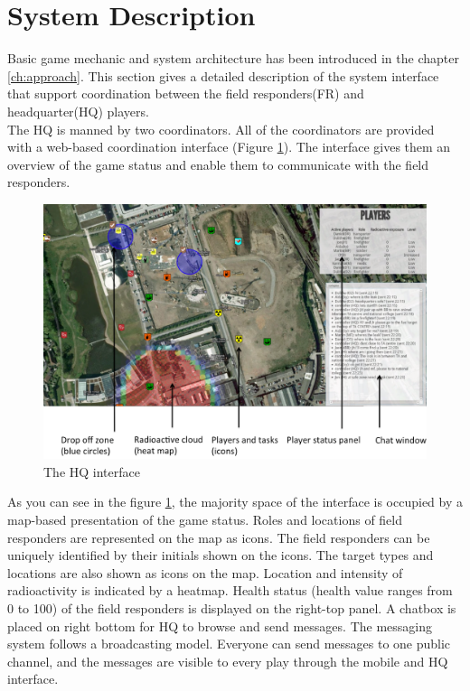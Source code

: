 \section{System Description}\label{sec:system1}
Basic game mechanic and system architecture has been introduced in the chapter \ref{ch:approach}. This section gives a detailed description of the system interface that support coordination between the field responders(FR) and headquarter(HQ) players. \\

The HQ is manned by two coordinators. All of the coordinators are provided with a web-based coordination interface (Figure \ref{fig:HQinterface}). The interface gives them an overview of the game status and enable them to communicate with the field responders. \\

\begin{figure}[h]
  \centering
  \includegraphics[width=1\textwidth]{img/study1/webinterface}
  \caption{The HQ interface}
  \label{fig:HQinterface}
\end{figure}

As you can see in the figure \ref{fig:HQinterface}, the majority space of the interface is occupied by a map-based presentation of the game status. Roles and locations of field responders are represented on the map as icons. The field responders can be uniquely identified by their initials shown on the icons. The target types and locations are also shown as icons on the map. Location and intensity of radioactivity is indicated by a heatmap. Health status (health value ranges from 0 to 100) of the field responders is displayed on the right-top panel. A chatbox is placed on right bottom for HQ to browse and send messages. The messaging system follows a broadcasting model. Everyone can send messages to one public channel, and the messages are visible to every play through the mobile and HQ interface.\\

